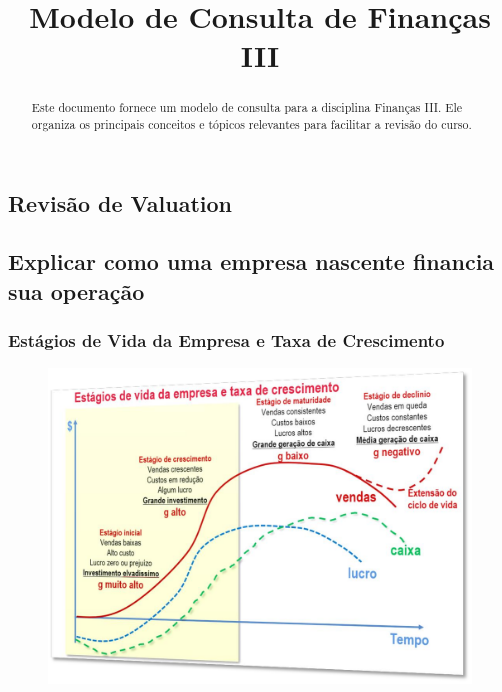 \documentclass{sciposter}
\title{Modelo de Consulta de Finanças III}
\institute 
{Bacharelado em Economia\\
Insper - Instituto de Ensino e Pesquisa\\
São Paulo, Brasil}
\begin{document}

\maketitle

\begin{multicols}{3}

\begin{abstract}
Este documento fornece um modelo de consulta para a disciplina Finanças III. Ele organiza os principais conceitos e tópicos relevantes para facilitar a revisão do curso.
\end{abstract}

\section{\textbf{Revisão de Valuation}}
\subsection{\textbf{Explicar como uma empresa nascente financia sua operação}}
\subsubsection*{\textbf{Estágios de Vida da Empresa e Taxa de Crescimento}}
\begin{figure}[H]
    \centering
    \includegraphics[width=1.0\textwidth]{evetc.png}
\end{figure}

\end{multicols}
\end{document}

